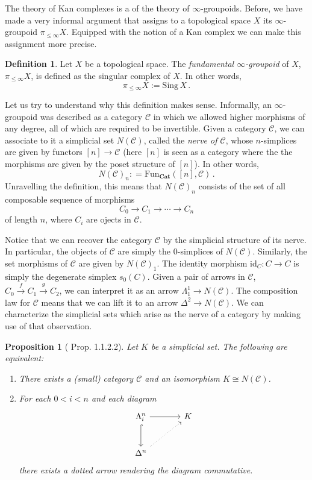 \documentclass[a4paper,11pt]{article}
\newcommand{\ccal}{\mathcal{C}}
\newcommand{\ide}{\mathrm{id}}
\theoremstyle{plain}
\newtheorem{prop}[thm]{Proposition}
\theoremstyle{definition}
\newtheorem{defi}[thm]{Definition}
\theoremstyle{remark}
\begin{document}
The theory of Kan complexes is a  of the theory of $\infty$-groupoids. Before, we have made a very informal argument that assigns to a topological space $X$ its $\infty$-groupoid $\pi_{\leq \infty} X$. Equipped with the notion of a Kan complex we can make this assignment more precise. 

\begin{defi}
Let $X$ be a topological space. The \textit{fundamental $\infty$-groupoid} of $X$, $\pi_{\leq \infty} X$, is defined as the singular complex of $X$. In other words, 
$$\pi_{\leq \infty} X := \text{Sing}\, X \, .$$
\end{defi}


Let us try to understand why this definition makes sense. Informally, an $\infty$-groupoid was described as a category $\ccal$ in which we allowed higher morphisms of any degree, all of which are required to be invertible. Given a category $\ccal$, we can associate to it a simplicial set $N(\ccal)$, called the \textit{nerve of $\ccal$}, whose $n$-simplices are given by functors $[n] \to \ccal$ (here $[n]$ is seen as a category where the the morphisms are given by the poset structure of $[n]$). In other words, 
$$N(\ccal)_n: = \text{Fun}_{\textbf{Cat}}([n], \ccal) \, .$$
Unravelling the definition, this means that $N(\ccal)_n$ consists of the set of all composable sequence of morphisms 
$$C_0 \to C_1 \to \cdots \to C_n$$
of length $n$, where $C_i$ are ojects in $\ccal$. 

Notice that we can recover the category $\ccal$ by the simplicial structure of its nerve. In particular, the objects of $\ccal$ are simply the $0$-simplices of $N(\ccal)$. Similarly, the set morphisms of $\ccal$ are given by $N(\ccal)_1$. The identity morphism $\ide_C \colon C \to C$ is simply the degenerate simplex $s_0(C)$. Given a pair of arrows in $\ccal$, $C_0 \xrightarrow{f} C_1 \xrightarrow{g} C_2$, we can interpret it as an arrow $\Lambda_1^1 \to N(\ccal)$. The composition law for $\ccal$ means that we can lift it to an arrow $\Delta^2 \to N(\ccal)$. We can characterize the simplicial sets which arise as the nerve of a category by making use of that observation. 

\begin{prop}[\cite{topos} Prop. 1.1.2.2]
Let $K$ be a simplicial set. The following are equivalent: 
\begin{enumerate}[label = \arabic*)]
    \item There exists a (small) category $\ccal$ and an isomorphism $K \cong N(\ccal)$. 
    \item For each $0<i<n$ and each diagram 
    \begin{equation*}
        \begin{tikzcd}[row sep = large, column sep = large]
        \Lambda_i^n \arrow[r] \arrow[d, hook] & K \\
        \Delta^n \arrow[ru, dotted] &
        \end{tikzcd}
    \end{equation*}
    there exists a  dotted arrow rendering the diagram commutative. 
\end{enumerate}
\end{prop}
\end{document}
